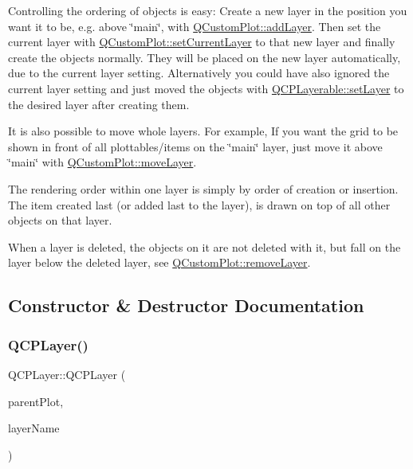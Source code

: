 Controlling the ordering of objects is easy\+: Create a new layer in the position you want it to be, e.\+g. above \char`\"{}main\char`\"{}, with \hyperlink{class_q_custom_plot_ad5255393df078448bb6ac83fa5db5f52}{Q\+Custom\+Plot\+::add\+Layer}. Then set the current layer with \hyperlink{class_q_custom_plot_a73a6dc47c653bb6f8f030abca5a11852}{Q\+Custom\+Plot\+::set\+Current\+Layer} to that new layer and finally create the objects normally. They will be placed on the new layer automatically, due to the current layer setting. Alternatively you could have also ignored the current layer setting and just moved the objects with \hyperlink{class_q_c_p_layerable_ab0d0da6d2de45a118886d2c8e16d5a54}{Q\+C\+P\+Layerable\+::set\+Layer} to the desired layer after creating them.

It is also possible to move whole layers. For example, If you want the grid to be shown in front of all plottables/items on the \char`\"{}main\char`\"{} layer, just move it above \char`\"{}main\char`\"{} with \hyperlink{class_q_custom_plot_ae896140beff19424e9e9e02d6e331104}{Q\+Custom\+Plot\+::move\+Layer}.

The rendering order within one layer is simply by order of creation or insertion. The item created last (or added last to the layer), is drawn on top of all other objects on that layer.

When a layer is deleted, the objects on it are not deleted with it, but fall on the layer below the deleted layer, see \hyperlink{class_q_custom_plot_a40f75e342c5eaab6a86066a42a0e2a94}{Q\+Custom\+Plot\+::remove\+Layer}. 

\subsection{Constructor \& Destructor Documentation}
\hypertarget{class_q_c_p_layer_a5d0657fc86d624e5efbe930ef21af718}{}\label{class_q_c_p_layer_a5d0657fc86d624e5efbe930ef21af718} 
\subsubsection{\texorpdfstring{Q\+C\+P\+Layer()}{QCPLayer()}}
{\footnotesize\ttfamily Q\+C\+P\+Layer\+::\+Q\+C\+P\+Layer (\begin{DoxyParamCaption}\item[{\hyperlink{class_q_custom_plot}{Q\+Custom\+Plot} $\ast$}]{parent\+Plot,  }\item[{const Q\+String \&}]{layer\+Name }\end{DoxyParamCaption})}

